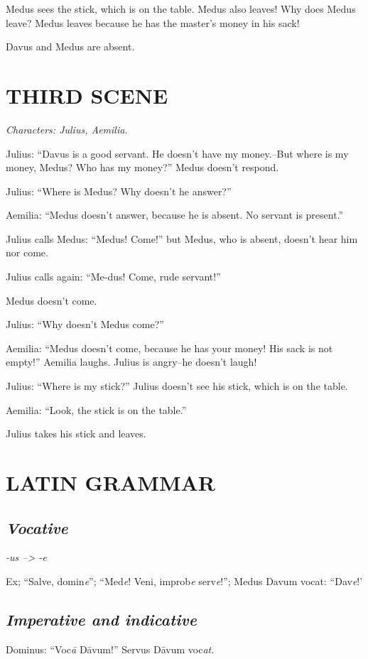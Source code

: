 Medus sees the stick, which is on the table. Medus also leaves! Why does Medus leave? Medus leaves because he has the master's money in his sack!

Davus and Medus are absent.

\section[Third scene]{THIRD SCENE}
\emph{Characters: Julius, Aemilia.}

Julius: ``Davus is a good servant. He doesn't have my money.--But where is my money, Medus? Who has my money?'' Medus doesn't respond.

Julius: ``Where is Medus? Why doesn't he answer?''

Aemilia: ``Medus doesn't answer, because he is absent. No servant is present.''

Julius calls Medus: ``Medus! Come!'' but Medus, who is absent, doesn't hear him nor come.

Julius calls again: ``Me-dus! Come, rude servant!''

Medus doesn't come.

Julius: ``Why doesn't Medus come?''

Aemilia: ``Medus doesn't come, because he has your money! His sack is not empty!'' Aemilia laughs. Julius is angry--he doesn't laugh!

Julius: ``Where is my stick?'' Julius doesn't see his stick, which is on the table.

Aemilia: ``Look, the stick is on the table.''

Julius takes his stick and leaves.

\section[Grammar]{LATIN GRAMMAR}
\subsection{\emph{Vocative}}
\emph{-us --> -e}

Ex; ``Salve, domin\emph{e}''; ``Med\emph{e}! Veni, improb\emph{e} serv\emph{e}!''; Medus Davum vocat: ``Dav\emph{e}!'

\subsection{\emph{Imperative and indicative}}
Dominus: ``Voc\emph{\=a} D\=avum!'' Servus D\=avum voc\emph{at}.

